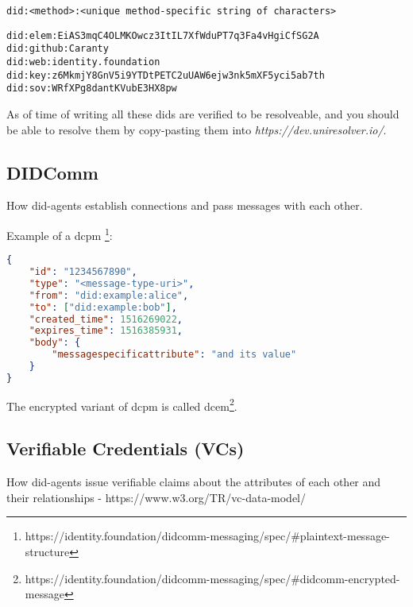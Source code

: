 \begin{lstlisting}[caption={DID-signature}]
did:<method>:<unique method-specific string of characters>
\end{lstlisting}

\begin{lstlisting}[caption={Depending on the DID-method, different DIDs may look very different from each other.}]
did:elem:EiAS3mqC4OLMKOwcz3ItIL7XfWduPT7q3Fa4vHgiCfSG2A
did:github:Caranty
did:web:identity.foundation
did:key:z6MkmjY8GnV5i9YTDtPETC2uUAW6ejw3nk5mXF5yci5ab7th
did:sov:WRfXPg8dantKVubE3HX8pw

\end{lstlisting}

As of time of writing all these \acrshort{dids} are verified to be resolveable, and you should be able to resolve them by copy-pasting them into \textit{https://dev.uniresolver.io/\cite{UniversalResolver}}.



\newpage

\subsection{DIDComm}

How \acrshort{did}-agents establish connections and pass messages with each other.


Example of a \acrfull{dcpm} \footnote{https://identity.foundation/didcomm-messaging/spec/\#plaintext-message-structure}:
\begin{lstlisting}[language=json]
{
    "id": "1234567890",
    "type": "<message-type-uri>",
    "from": "did:example:alice",
    "to": ["did:example:bob"],
    "created_time": 1516269022,
    "expires_time": 1516385931,
    "body": {
    	"messagespecificattribute": "and its value"
    }
}
\end{lstlisting}

The encrypted variant of \acrfull{dcpm} is called \acrfull{dcem}\footnote{https://identity.foundation/didcomm-messaging/spec/\#didcomm-encrypted-message}.



\subsection{Verifiable Credentials (VCs)} 

How \acrshort{did}-agents issue verifiable claims about the attributes of each other and their relationships - https://www.w3.org/TR/vc-data-model/ 

